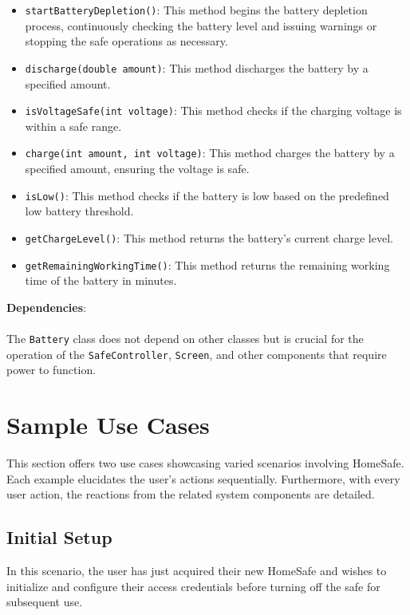 \documentclass{article}
\begin{document}
\begin{itemize}
    \item \texttt{startBatteryDepletion()}: This method begins the battery depletion process, continuously checking the battery level and issuing warnings or stopping the safe operations as necessary.
    \item \texttt{discharge(double amount)}: This method discharges the battery by a specified amount.
    \item \texttt{isVoltageSafe(int voltage)}: This method checks if the charging voltage is within a safe range.
    \item \texttt{charge(int amount, int voltage)}: This method charges the battery by a specified amount, ensuring the voltage is safe.
    \item \texttt{isLow()}: This method checks if the battery is low based on the predefined low battery threshold.
    \item \texttt{getChargeLevel()}: This method returns the battery's current charge level.
    \item \texttt{getRemainingWorkingTime()}: This method returns the remaining working time of the battery in minutes.
\end{itemize}
\textbf{Dependencies}: \\ \\
The \texttt{Battery} class does not depend on other classes but is crucial for the operation of the \texttt{SafeController}, \texttt{Screen}, and other components that require power to function.

\section{Sample Use Cases}
This section offers two use cases showcasing varied scenarios involving HomeSafe. Each example elucidates the user's actions sequentially. Furthermore, with every user action, the reactions from the related system components are detailed.

\subsection{Initial Setup}
In this scenario, the user has just acquired their new HomeSafe and wishes to initialize and configure their access credentials before turning off the safe for subsequent use.
\end{document}
